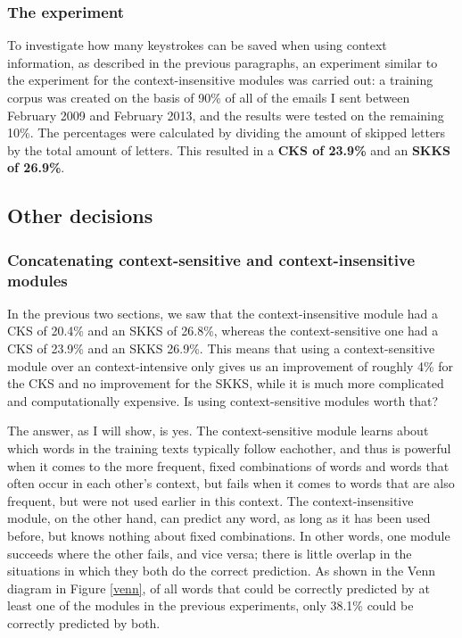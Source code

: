 \documentclass[11pt]{article}
\begin{document}
\subsubsection{The experiment}

To investigate how many keystrokes can be saved when using context information, as described in the previous paragraphs, an experiment similar to the experiment for the context-insensitive modules was carried out: a training corpus was created on the basis of 90\% of all of the emails I sent between February 2009 and February 2013, and the results were tested on the remaining 10\%. The percentages were calculated by dividing the amount of skipped letters by the total amount of letters. This resulted in a \textbf{CKS of 23.9\%} and an \textbf{SKKS of 26.9\%}.

\subsection{Other decisions}

\subsubsection{Concatenating context-sensitive and context-insensitive modules} \label{concat}
In the previous two sections, we saw that the context-insensitive module had a CKS of 20.4\% and an SKKS of 26.8\%, whereas the context-sensitive one had a CKS of 23.9\% and an SKKS 26.9\%. This means that using a context-sensitive module over an context-intensive only gives us an improvement of roughly 4\% for the CKS and no improvement for the SKKS, while it is much more complicated and computationally expensive. Is using context-sensitive modules worth that?

The answer, as I will show, is yes. The context-sensitive module learns about which words in the training texts typically follow eachother, and thus is powerful when it comes to the more frequent, fixed combinations of words and words that often occur in each other's context, but fails when it comes to words that are also frequent, but were not used earlier in this context. The context-insensitive module, on the other hand, can predict any word, as long as it has been used before, but knows nothing about fixed combinations. In other words, one module succeeds where the other fails, and vice versa; there is little overlap in the situations in which they both do the correct prediction. As shown in the Venn diagram in Figure \ref{venn}, of all words that could be correctly predicted by at least one of the modules in the previous experiments, only 38.1\% could be correctly predicted by both.
\end{document}
